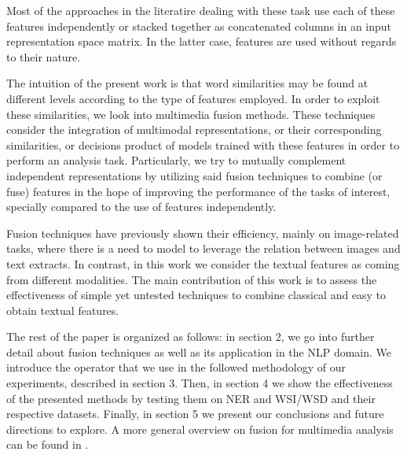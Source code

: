 \documentclass{llncs}
\begin{document}

Most of the approaches in the literatire dealing with these task use each of these features independently or stacked together as concatenated columns in an input representation space matrix. In the latter case, features are used without regards to their nature. 

The intuition of the present work is that word similarities may be found at different levels according to the type of features employed. In order to exploit these similarities, we look into multimedia fusion methods. These techniques consider the integration of multimodal representations, or their corresponding similarities, or  decisions product of models trained with these features in order to perform an analysis task.  Particularly, we try to mutually complement independent representations by utilizing said fusion techniques to combine (or fuse) features in the hope of improving the performance of the tasks of interest, specially compared to the use of features independently. 

Fusion techniques have previously shown their efficiency, mainly on image-related tasks, where there is a need to model to leverage the relation  between images and text extracts.
%
%
In contrast, in this work we consider the textual features as coming from different modalities. The main contribution of this work is to assess the effectiveness of simple yet untested techniques to combine classical and easy to obtain textual features. 

The rest of the paper is organized as follows: in section 2, we go into further detail about fusion techniques as well as its application in the NLP domain. We introduce the operator that we use in the followed methodology of our experiments, described in section 3. Then, in section 4 we show the effectiveness of the presented methods by testing them on NER and WSI/WSD and their respective datasets. Finally, in section 5 we present our conclusions and future directions to explore. A more general overview on fusion for multimedia analysis can be found in \cite{AtreyHEK10}.
\end{document}
